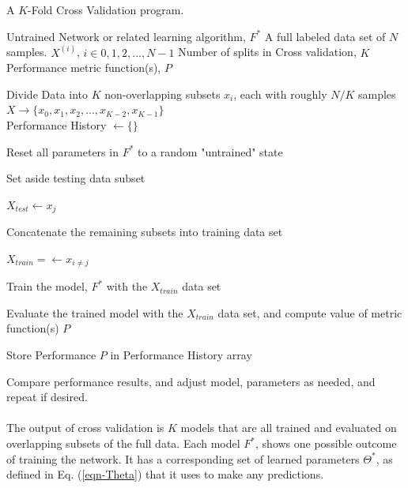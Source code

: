 \documentclass[12pt,letterpaper]{article}
\begin{document}
\begin{algorithm}[H]
\caption{A $K$-Fold Cross Validation program.}
\label{algFeedForward}

\begin{algorithmic}
\REQUIRE Untrained Network or related learning algorithm, $F^*$
\REQUIRE A full labeled data set of $N$ samples. $X^{(i)}$, $i \in {0,1,2,...,N-1}$
\REQUIRE Number of splits in Cross validation, $K$
\REQUIRE Performance metric function(s), $P$

Divide Data into $K$ non-overlapping subsets $x_{i}$, each with roughly $N/K$ samples \\
$X \rightarrow \big\{ x_{0}, x_{1}, x_{2}, ..., x_{K-2},  x_{K-1} \big\}$ \\
Performance History $\leftarrow \{\}$

	\item Reset all parameters in $F^*$ to a random "untrained" state
	\item Set aside testing data subset
	\item $X_{test} \leftarrow x_{j}$
	\item Concatenate the remaining subsets into training data set
	\item $X_{train} =\leftarrow x_{i \neq j}$
	\item Train the model, $F^*$ with the $X_{train}$ data set
	\item Evaluate the trained model with the $X_{train}$ data set, and compute value of metric function(s) $P$
	\item Store Performance $P$ in Performance History array
\ENDFOR

Compare performance results, and adjust model, parameters as needed, and repeat if desired.

\end{algorithmic}
\end{algorithm}

\paragraph*{}The output of cross validation is $K$ models that are all trained and evaluated on overlapping subsets of the full data. Each model $F^*$, shows one possible outcome of training the network. It has a corresponding set of learned parameters $\Theta^*$, as defined in Eq. (\ref{eqn-Theta}) that it uses to make any predictions. 

\end{document}
